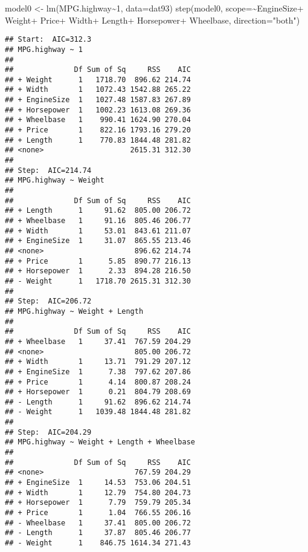 \documentclass[
]{book}
\newenvironment{Shaded}{\begin{snugshade}}{\end{snugshade}}
\newcommand{\AttributeTok}[1]{\textcolor[rgb]{0.77,0.63,0.00}{#1}}
\newcommand{\DecValTok}[1]{\textcolor[rgb]{0.00,0.00,0.81}{#1}}
\newcommand{\FunctionTok}[1]{\textcolor[rgb]{0.00,0.00,0.00}{#1}}
\newcommand{\NormalTok}[1]{#1}
\newcommand{\OtherTok}[1]{\textcolor[rgb]{0.56,0.35,0.01}{#1}}
\newcommand{\SpecialCharTok}[1]{\textcolor[rgb]{0.00,0.00,0.00}{#1}}
\newcommand{\StringTok}[1]{\textcolor[rgb]{0.31,0.60,0.02}{#1}}
\begin{document}
\begin{Shaded}
\begin{Highlighting}[]
\NormalTok{model0 }\OtherTok{\textless{}{-}} \FunctionTok{lm}\NormalTok{(MPG.highway}\SpecialCharTok{\textasciitilde{}}\DecValTok{1}\NormalTok{, }\AttributeTok{data=}\NormalTok{dat93)}
\FunctionTok{step}\NormalTok{(model0,  }\AttributeTok{scope=}\SpecialCharTok{\textasciitilde{}}\NormalTok{EngineSize}\SpecialCharTok{+}\NormalTok{ Weight}\SpecialCharTok{+}\NormalTok{ Price}\SpecialCharTok{+}\NormalTok{ Width}\SpecialCharTok{+}\NormalTok{ Length}\SpecialCharTok{+}\NormalTok{ Horsepower}\SpecialCharTok{+}\NormalTok{ Wheelbase, }\AttributeTok{direction=}\StringTok{"both"}\NormalTok{)}
\end{Highlighting}
\end{Shaded}

\begin{verbatim}
## Start:  AIC=312.3
## MPG.highway ~ 1
## 
##              Df Sum of Sq     RSS    AIC
## + Weight      1   1718.70  896.62 214.74
## + Width       1   1072.43 1542.88 265.22
## + EngineSize  1   1027.48 1587.83 267.89
## + Horsepower  1   1002.23 1613.08 269.36
## + Wheelbase   1    990.41 1624.90 270.04
## + Price       1    822.16 1793.16 279.20
## + Length      1    770.83 1844.48 281.82
## <none>                    2615.31 312.30
## 
## Step:  AIC=214.74
## MPG.highway ~ Weight
## 
##              Df Sum of Sq     RSS    AIC
## + Length      1     91.62  805.00 206.72
## + Wheelbase   1     91.16  805.46 206.77
## + Width       1     53.01  843.61 211.07
## + EngineSize  1     31.07  865.55 213.46
## <none>                     896.62 214.74
## + Price       1      5.85  890.77 216.13
## + Horsepower  1      2.33  894.28 216.50
## - Weight      1   1718.70 2615.31 312.30
## 
## Step:  AIC=206.72
## MPG.highway ~ Weight + Length
## 
##              Df Sum of Sq     RSS    AIC
## + Wheelbase   1     37.41  767.59 204.29
## <none>                     805.00 206.72
## + Width       1     13.71  791.29 207.12
## + EngineSize  1      7.38  797.62 207.86
## + Price       1      4.14  800.87 208.24
## + Horsepower  1      0.21  804.79 208.69
## - Length      1     91.62  896.62 214.74
## - Weight      1   1039.48 1844.48 281.82
## 
## Step:  AIC=204.29
## MPG.highway ~ Weight + Length + Wheelbase
## 
##              Df Sum of Sq     RSS    AIC
## <none>                     767.59 204.29
## + EngineSize  1     14.53  753.06 204.51
## + Width       1     12.79  754.80 204.73
## + Horsepower  1      7.79  759.79 205.34
## + Price       1      1.04  766.55 206.16
## - Wheelbase   1     37.41  805.00 206.72
## - Length      1     37.87  805.46 206.77
## - Weight      1    846.75 1614.34 271.43
\end{verbatim}
\end{document}
